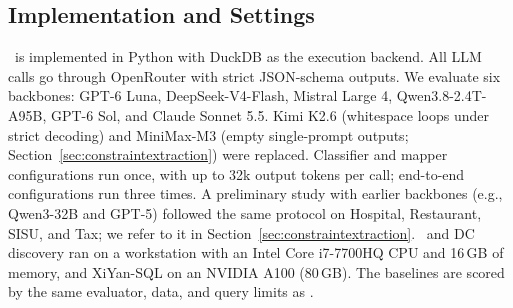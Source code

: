 \subsection{Implementation and Settings}
\label{sec:implementation}

\system\ is implemented in Python with DuckDB as the execution backend. All LLM calls go through OpenRouter with strict JSON-schema outputs. We evaluate six backbones: GPT-6 Luna, DeepSeek-V4-Flash, Mistral Large 4, Qwen3.8-2.4T-A95B, GPT-6 Sol, and Claude Sonnet 5.5. Kimi K2.6 (whitespace loops under strict decoding) and MiniMax-M3 (empty single-prompt outputs; Section~\ref{sec:constraintextraction}) were replaced. Classifier and mapper configurations run once, with up to 32k output tokens per call; end-to-end configurations run three times. A preliminary study with earlier backbones (e.g., Qwen3-32B and GPT-5) followed the same protocol on Hospital, Restaurant, SISU, and Tax; we refer to it in Section~\ref{sec:constraintextraction}. \system\ and DC discovery ran on a workstation with an Intel Core i7-7700HQ CPU and 16\,GB of memory, and XiYan-SQL on an NVIDIA A100 (80\,GB). The baselines are scored by the same evaluator, data, and query limits as \system.
